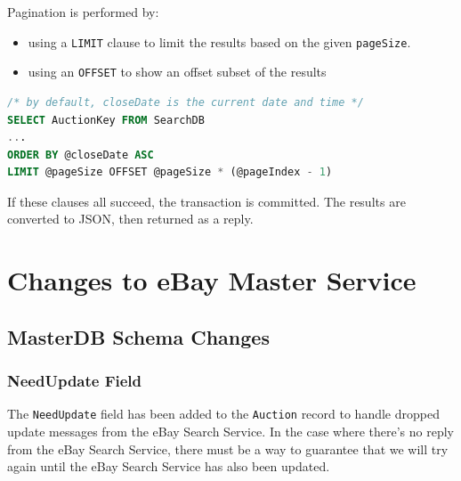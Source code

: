 \documentclass[12pt,a4paper]{article}
\begin{document}
Pagination is performed by:

\begin{itemize} 
    \item using a \texttt{LIMIT} clause to limit the results based on the given \texttt{pageSize}.
    \item using an \texttt{OFFSET} to show an offset subset of the results
\end{itemize}

\begin{center}
\begin{lstlisting}[language = SQL,  
    showspaces=false,
    basicstyle=\ttfamily,
    numbers=none,
    commentstyle=\color{gray}]
/* by default, closeDate is the current date and time */
SELECT AuctionKey FROM SearchDB
...
ORDER BY @closeDate ASC 
LIMIT @pageSize OFFSET @pageSize * (@pageIndex - 1) 

\end{lstlisting}

\end{center}

If these clauses all succeed, the transaction is committed.
The results are converted to JSON, then returned as a reply.
\pagebreak
\section{Changes to eBay Master Service}


\subsection{MasterDB Schema Changes}

\subsubsection{NeedUpdate Field} 
\label{sec:needupdate}


The \texttt{NeedUpdate} field has been added to the \texttt{Auction} record to handle 
dropped update messages from the eBay Search Service. In the case where there's no reply 
from the eBay Search Service, there must be a way to guarantee that we will try again 
until the eBay Search Service has also been updated.
\end{document}
